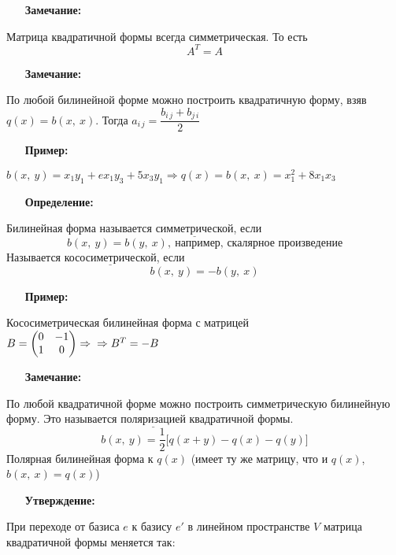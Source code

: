 \documentclass[12pt, letterpaper, twoside]{article}
\begin{document}
    \begin{enumerate}
        \item[\textbf{Замечание:}]
    \end{enumerate}
    Матрица квадратичной формы всегда симметрическая. То есть \[A^T = A\]
    \begin{enumerate}
        \item[\textbf{Замечание:}]
    \end{enumerate}
    По любой билинейной форме можно построить квадратичную форму, взяв $q(x) = b(x,\ x)$. Тогда $a_{i\, j} = \dfrac{b_{i\, j} + b_{j\, i}}{2}$
    \begin{enumerate}
        \item[\textbf{Пример:}]
    \end{enumerate}
    $b(x,\ y) = x_1 y_1 + e x_1 y_3 + 5 x_3 y_1\Rightarrow q(x) = b(x,\ x) = x^2_1 + 8 x_1 x_3$
    \begin{enumerate}
        \item[\textbf{Определение:}]
    \end{enumerate}
    Билинейная форма называется $\underline{\text{симметрической}}$, если \[b(x,\ y) = b(y,\ x),\ \text{например, скалярное произведение}\] Называется $\underline{\text{кососиметрической}}$, если \[b(x,\ y) = -b(y,\ x)\]
    \begin{enumerate}
        \item[\textbf{Пример:}]
    \end{enumerate}
    Кососиметрическая билинейная форма с матрицей $B = \begin{pmatrix}
            0 & -1\\
            1 & 0
        \end{pmatrix}\Rightarrow\\\Rightarrow B^T = -B$
    \begin{enumerate}
        \item[\textbf{Замечание:}]
    \end{enumerate}
    По любой квадратичной форме можно построить симметрическую билинейную форму. Это называется $\underline{\text{поляризацией}}$ квадратичной формы.\[b(x,\ y) = \frac{1}{2}\big[q(x + y) - q(x) - q(y)\big]\] Полярная билинейная форма к $q(x)$ \big(имеет ту же матрицу, что и $q(x)$, $b(x,\ x) = q(x)$\big)
    \newpage
    \begin{enumerate}
        \item[\textbf{Утверждение:}]
    \end{enumerate}
    При переходе от базиса $e$ к базису $e'$ в линейном пространстве $V$ матрица квадратичной формы меняется так:
\end{document}
